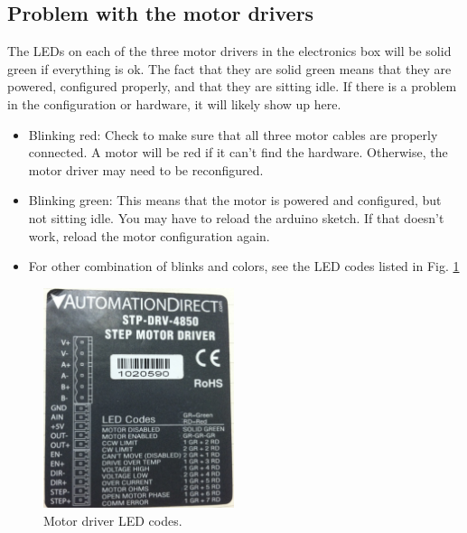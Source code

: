 \documentclass[11pt]{article}
\begin{document}
\subsection{Problem with the motor drivers}
The LEDs on each of the three motor drivers in the electronics box will be solid green if everything is ok.
The fact that they are solid green means that they are powered, configured properly, and that they are sitting idle.  
If there is a problem in the configuration or hardware, it will likely show up here.
\begin{itemize}
 	\item Blinking red:  Check to make sure that all three motor cables are properly connected.  
		A motor will be red if it can't find the hardware.  Otherwise, the motor driver may need to be reconfigured.
	\item Blinking green:  This means that the motor is powered and configured, but not sitting idle.  You may have to reload the arduino sketch.  If that doesn't work, reload the motor 		configuration again.
	\item For other combination of blinks and colors, see the LED codes listed in Fig. \ref{ledCodes}
\end{itemize}

\begin{figure}[h]
\begin{center}
\includegraphics[width = 2.2in]{photoLedCodes.JPG}
\caption{Motor driver LED codes.}  
\label{ledCodes}
\end{center}
\end{figure}
\end{document}
